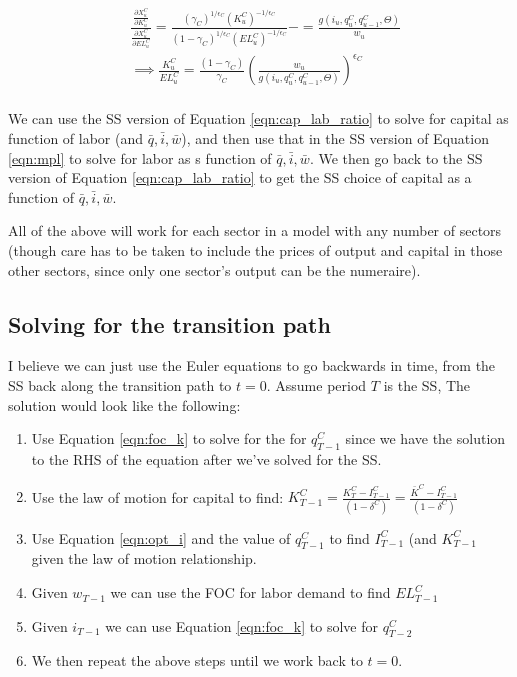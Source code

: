 \documentclass[article,11pt,letterpaper,fleqn]{article}
\theoremstyle{definition}
\numberwithin{equation}{section}
\begin{document}
\begin{equation}
\label{eqn:cap_lab_ratio}
\begin{split}
& \frac{\frac{\partial X^{C}_{u}}{\partial K^{C}_{u}}}{\frac{\partial X^{C}_{u}}{\partial EL^{C}_{u}}} =\frac{(\gamma_{C})^{1/\epsilon_{C}}(K^{C}_{u})^{-1/\epsilon_{C}}}{(1-\gamma_{C})^{1/\epsilon_{C}}(EL^{C}_{u})^{-1/\epsilon_{C}}}-=\frac{g(i_{u},q^{C}_{u},q^{C}_{u-1},\Theta)}{w_{u}} \\
& \implies \frac{K^{C}_{u}}{EL^{C}_{u}} =\frac{(1-\gamma_{C})}{\gamma_{C}}\left(\frac{w_{u}} {g(i_{u},q^{C}_{u},q^{C}_{u-1},\Theta)}\right)^{\epsilon_{C}} \\
\end{split}
\end{equation}

We can use the SS version of Equation \ref{eqn:cap_lab_ratio} to solve for capital as function of labor (and $\bar{q}, \bar{i}, \bar{w}$), and then use that in the SS version of Equation \ref{eqn:mpl} to solve for labor as s function of $\bar{q}, \bar{i}, \bar{w}$.  We then go back to the SS version of Equation \ref{eqn:cap_lab_ratio} to get the SS choice of capital as a function of $\bar{q}, \bar{i}, \bar{w}$.

All of the above will work for each sector in a model with any number of sectors (though care has to be taken to include the prices of output and capital in those other sectors, since only one sector's output can be the numeraire).

\subsection{Solving for the transition path}

I believe we can just use the Euler equations to go backwards in time, from the SS back along the transition path to $t=0$.  Assume period $T$ is the SS,  The solution would look like the following:

\begin{enumerate}
\item Use Equation \ref{eqn:foc_k} to solve for the for $q^{C}_{T-1}$ since we have the solution to the RHS of the equation after we've solved for the SS.
\item Use the law of motion for capital to find: $K^{C}_{T-1}=\frac{K^{C}_{T}-I^{C}_{T-1}}{(1-\delta^{C})}=\frac{\bar{K}^{C}-I^{C}_{T-1}}{(1-\delta^{C})}$
\item Use Equation \ref{eqn:opt_i} and the value of $q^{C}_{T-1}$ to find $I^{C}_{T-1}$ (and $K^{C}_{T-1}$ given the law of motion relationship.
\item Given $w_{T-1}$ we can use the FOC for labor demand to find $EL^{C}_{T-1}$
\item Given $i_{T-1}$ we can use Equation \ref{eqn:foc_k} to solve for $q^{C}_{T-2}$ 
\item We then repeat the above steps until we work back to $t=0$.
\end{enumerate}
\end{document}
